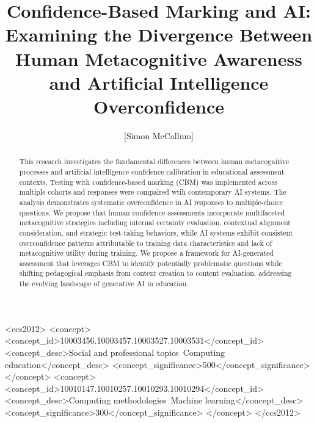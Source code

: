 \documentclass[sigconf]{acmart}
\begin{document}
\title{Confidence-Based Marking and AI: Examining the Divergence Between Human Metacognitive Awareness and Artificial Intelligence Overconfidence}

\author{[Simon McCallum]}

\begin{abstract}
This research investigates the fundamental differences between human metacognitive processes and artificial intelligence confidence calibration in educational assessment contexts. Testing with confidence-based marking (CBM) was implemented across multiple cohorts and responses were compaired wtih contemporary AI systems. The analysis demonstrates systematic overconfidence in AI responses to multiple-choice questions. We propose that human confidence assessments incorporate multifaceted metacognitive strategies including internal certainty evaluation, contextual alignment consideration, and strategic test-taking behaviors, while AI systems exhibit consistent overconfidence patterns attributable to training data characteristics and lack of metacognitive utility during training. We propose a framework for AI-generated assessment that leverages CBM to identify potentially problematic questions while shifting pedagogical emphasis from content creation to content evaluation, addressing the evolving landscape of generative AI in education.
\end{abstract}

\begin{CCSXML}
<ccs2012>
<concept>
<concept_id>10003456.10003457.10003527.10003531</concept_id>
<concept_desc>Social and professional topics~Computing education</concept_desc>
<concept_significance>500</concept_significance>
</concept>
<concept>
<concept_id>10010147.10010257.10010293.10010294</concept_id>
<concept_desc>Computing methodologies~Machine learning</concept_desc>
<concept_significance>300</concept_significance>
</concept>
</ccs2012>
\end{CCSXML}


\end{document}
